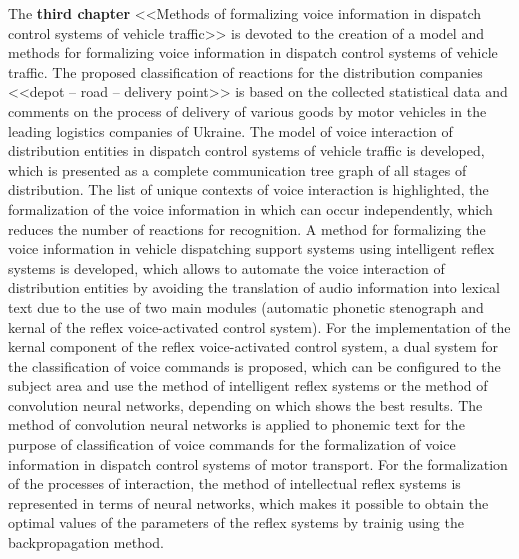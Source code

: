 The \textbf{third chapter} <<Methods of formalizing voice information in dispatch control systems of vehicle traffic>> is devoted to the creation of a model and methods for formalizing voice information in dispatch control systems of vehicle traffic.
The proposed classification of reactions for the distribution companies <<depot -- road -- delivery point>> is based on the collected statistical data and comments on the process of delivery of various goods by motor vehicles in the leading logistics companies of Ukraine.
The model of voice interaction of distribution entities in dispatch control systems of vehicle traffic is developed, which is presented as a complete communication tree graph of all stages of distribution.
The list of unique contexts of voice interaction is highlighted, the formalization of the voice information in which can occur independently, which reduces the number of reactions for recognition.
A method for formalizing the voice information in vehicle dispatching support systems using intelligent reflex systems is developed, which allows to automate the voice interaction of distribution entities by avoiding the translation of audio information into lexical text due to the use of two main modules (automatic phonetic stenograph and kernal of the reflex voice-activated control system).
For the implementation of the kernal component of the reflex voice-activated control system, a dual system for the classification of voice commands is proposed, which can be configured to the subject area and use the method of intelligent reflex systems or the method of convolution neural networks, depending on which shows the best results.
The method of convolution neural networks is applied to phonemic text for the purpose of classification of voice commands for the formalization of voice information in dispatch control systems of motor transport.
For the formalization of the processes of interaction, the method of intellectual reflex systems is represented in terms of neural networks, which makes it possible to obtain the optimal values of the parameters of the reflex systems by trainig using the backpropagation method.

